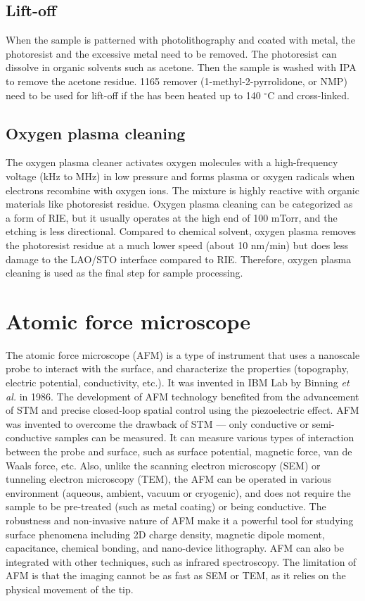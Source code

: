 \documentclass[pdflatex, sectionletters, 12pt]{pittetd}    %
\begin{document}
\subsection{Lift-off}

When the sample is patterned with photolithography and coated with metal, the photoresist and the excessive metal need to be removed. The photoresist can dissolve in organic solvents such as acetone. Then the sample is washed with IPA to remove the acetone residue. 1165 remover (1-methyl-2-pyrrolidone, or NMP) need to be used for lift-off if the has been heated up to 140 $^{\circ}$C and cross-linked.

\subsection{Oxygen plasma cleaning}

The oxygen plasma cleaner activates oxygen molecules with a high-frequency voltage (kHz to MHz) in low pressure and forms plasma or oxygen radicals when electrons recombine with oxygen ions. The mixture is highly reactive with organic materials like photoresist residue. Oxygen plasma cleaning can be categorized as a form of RIE, but it usually operates at the high end of 100 mTorr, and the etching is less directional. Compared to chemical solvent, oxygen plasma removes the photoresist residue at a much lower speed (about 10 nm/min) but does less damage to the LAO/STO interface compared to RIE. Therefore, oxygen plasma cleaning is used as the final step for sample processing.

\section{Atomic force microscope}
\label{SEC:AFM}

The atomic force microscope (AFM) is a type of instrument that uses a nanoscale probe to interact with the surface, and characterize the properties (topography, electric potential, conductivity, etc.). It was invented in IBM Lab by Binning \textit{et al.} \cite{binning1986atomic} in 1986. The development of AFM technology benefited from the advancement of STM and precise closed-loop spatial control using the piezoelectric effect. AFM was invented to overcome the drawback of STM --- only conductive or semi-conductive samples can be measured. It can measure various types of interaction between the probe and surface, such as surface potential, magnetic force, van de Waals force, etc. Also, unlike the scanning electron microscopy (SEM) or tunneling electron microscopy (TEM), the AFM can be operated in various environment (aqueous, ambient, vacuum or cryogenic), and does not require the sample to be pre-treated (such as metal coating) or being conductive. The robustness and non-invasive nature of AFM make it a powerful tool for studying surface phenomena including 2D charge density, magnetic dipole moment, capacitance, chemical bonding, and nano-device lithography. AFM can also be integrated with other techniques, such as infrared spectroscopy\cite{hammiche1999photothermal, pollock2006handbook}. The limitation of AFM is that the imaging cannot be as fast as SEM or TEM, as it relies on the physical movement of the tip.
\end{document}
